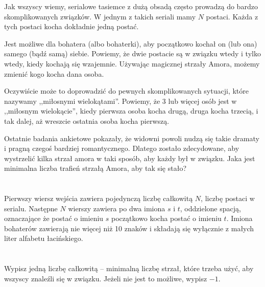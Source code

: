 \ifx\boi\undefined\fi
\def\version{jury-1}

Jak wszyscy wiemy, serialowe tasiemce z dużą obsadą często prowadzą do bardzo skomplikowanych związków.
W jednym z takich seriali mamy $N$ postaci. Każda z tych postaci kocha dokładnie jedną postać.

Jest możliwe dla bohatera (albo bohaterki), aby początkowo kochał on (lub ona) samego (bądź samą) siebie. Powiemy,
że dwie postacie są w związku wtedy i tylko wtedy, kiedy kochają się wzajemnie. Używając magicznej strzały Amora,
możemy zmienić kogo kocha dana osoba.

Oczywiście może to doprowadzić do pewnych skomplikowanych sytuacji, które nazywamy ,,miłosnymi wielokątami''.
Powiemy, że 3 lub więcej osób jest w ,,miłosnym wielokącie'', kiedy pierwsza osoba kocha drugą, druga kocha trzecią,
i tak dalej, aż wreszcie ostatnia osoba kocha pierwszą.

Ostatnie badania ankietowe pokazały, że widowni powoli nudzą się takie dramaty i pragną
czegoś bardziej romantycznego. Dlatego zostało zdecydowane, aby wystrzelić kilka strzał amora w taki sposób,
aby każdy był w związku. Jaka jest minimalna liczba trafień strzałą Amora, aby tak się stało?

\section*{}
Pierwszy wiersz wejścia zawiera pojedynczą liczbę całkowitą $N$, liczbę postaci w serialu.
Następne $N$ wierszy zawiera po dwa imiona $s$ i $t$, oddzielone spacją, oznaczające
że postać o imieniu $s$ początkowo kocha postać o imieniu $t$. Imiona bohaterów zawierają
nie więcej niż 10 znaków i składają się wyłącznie z małych liter alfabetu łacińskiego. %

\section*{\outputsection}
Wypisz jedną liczbę całkowitą -- minimalną liczbę strzał, które trzeba użyć, aby wszyscy
znaleźli się w związku. Jeżeli nie jest to możliwe, wypisz $-1$.

\section*{\constraints}
\testgroups

